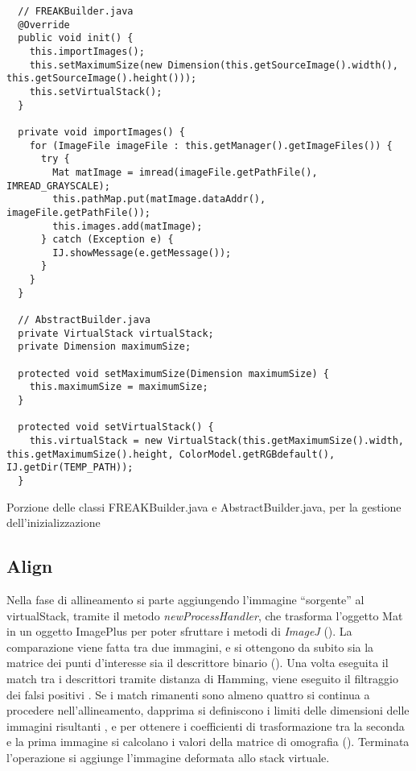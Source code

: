 \begin{listing}[H]
\begin{verbatim}
  // FREAKBuilder.java
  @Override
  public void init() {
    this.importImages();
    this.setMaximumSize(new Dimension(this.getSourceImage().width(), this.getSourceImage().height()));
    this.setVirtualStack();
  }

  private void importImages() {
    for (ImageFile imageFile : this.getManager().getImageFiles()) {
      try {
        Mat matImage = imread(imageFile.getPathFile(), IMREAD_GRAYSCALE);
        this.pathMap.put(matImage.dataAddr(), imageFile.getPathFile());
        this.images.add(matImage);
      } catch (Exception e) {
        IJ.showMessage(e.getMessage());
      }
    }
  }

  // AbstractBuilder.java 
  private VirtualStack virtualStack;
  private Dimension maximumSize;

  protected void setMaximumSize(Dimension maximumSize) {
    this.maximumSize = maximumSize;
  }

  protected void setVirtualStack() {
    this.virtualStack = new VirtualStack(this.getMaximumSize().width, this.getMaximumSize().height, ColorModel.getRGBdefault(), IJ.getDir(TEMP_PATH));
  }
\end{verbatim}
\caption{Porzione delle classi FREAKBuilder.java e AbstractBuilder.java, per la gestione dell'inizializzazione}\label{lst:init}
\end{listing}

\subsection{Align}
\noindent Nella fase di allineamento  si parte aggiungendo l'immagine ``sorgente'' al virtualStack, tramite il metodo \textit{newProcessHandler}, che trasforma l'oggetto Mat in un oggetto ImagePlus per poter sfruttare i metodi di \textit{ImageJ} (). La comparazione viene fatta tra due immagini, e si ottengono da subito sia la matrice dei punti d'interesse sia il descrittore binario (). Una volta eseguita il match tra i descrittori tramite distanza di Hamming, viene eseguito il filtraggio dei falsi positivi . Se i match rimanenti sono almeno quattro si continua a procedere nell'allineamento, dapprima si definiscono i limiti delle dimensioni delle immagini risultanti , e per ottenere i coefficienti di trasformazione tra la seconda e la prima immagine si calcolano i valori della matrice di omografia (). Terminata l'operazione si aggiunge l'immagine deformata allo stack virtuale.

